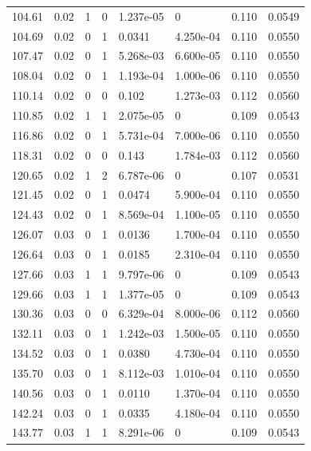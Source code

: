 \documentclass[preview]{standalone}
\begin{document}
{{{\begin{tabular}{L{1.2cm}C{1.2cm} C{0.3cm}C{0.5cm} C{1.4cm}C{1.4cm} C{1.4cm}C{1.4cm}}
  104.61  &  0.02  & 1     &  0 &  1.237e-05  & 0  & 0.110 &  0.0549   \\ 
  104.69  &  0.02  & 0     &  1 &  0.0341  & 4.250e-04  & 0.110 &  0.0550   \\ 
  107.47  &  0.02  & 0     &  1 &  5.268e-03  & 6.600e-05  & 0.110 &  0.0550   \\ 
  108.04  &  0.02  & 0     &  1 &  1.193e-04  & 1.000e-06  & 0.110 &  0.0550   \\ 
  110.14  &  0.02  & 0     &  0 &  0.102  & 1.273e-03  & 0.112 &  0.0560   \\ 
  110.85  &  0.02  & 1     &  1 &  2.075e-05  & 0  & 0.109 &  0.0543   \\ 
  116.86  &  0.02  & 0     &  1 &  5.731e-04  & 7.000e-06  & 0.110 &  0.0550   \\ 
  118.31  &  0.02  & 0     &  0 &  0.143  & 1.784e-03  & 0.112 &  0.0560   \\ 
  120.65  &  0.02  & 1     &  2 &  6.787e-06  & 0  & 0.107 &  0.0531   \\ 
  121.45  &  0.02  & 0     &  1 &  0.0474  & 5.900e-04  & 0.110 &  0.0550   \\ 
  124.43  &  0.02  & 0     &  1 &  8.569e-04  & 1.100e-05  & 0.110 &  0.0550   \\ 
  126.07  &  0.03  & 0     &  1 &  0.0136  & 1.700e-04  & 0.110 &  0.0550   \\ 
  126.64  &  0.03  & 0     &  1 &  0.0185  & 2.310e-04  & 0.110 &  0.0550   \\ 
  127.66  &  0.03  & 1     &  1 &  9.797e-06  & 0  & 0.109 &  0.0543   \\ 
  129.66  &  0.03  & 1     &  1 &  1.377e-05  & 0  & 0.109 &  0.0543   \\ 
  130.36  &  0.03  & 0     &  0 &  6.329e-04  & 8.000e-06  & 0.112 &  0.0560   \\ 
  132.11  &  0.03  & 0     &  1 &  1.242e-03  & 1.500e-05  & 0.110 &  0.0550   \\ 
  134.52  &  0.03  & 0     &  1 &  0.0380  & 4.730e-04  & 0.110 &  0.0550   \\ 
  135.70  &  0.03  & 0     &  1 &  8.112e-03  & 1.010e-04  & 0.110 &  0.0550   \\ 
  140.56  &  0.03  & 0     &  1 &  0.0110  & 1.370e-04  & 0.110 &  0.0550   \\ 
  142.24  &  0.03  & 0     &  1 &  0.0335  & 4.180e-04  & 0.110 &  0.0550   \\ 
  143.77  &  0.03  & 1     &  1 &  8.291e-06  & 0  & 0.109 &  0.0543   \\ 

\end{tabular}}}}
\end{document}
